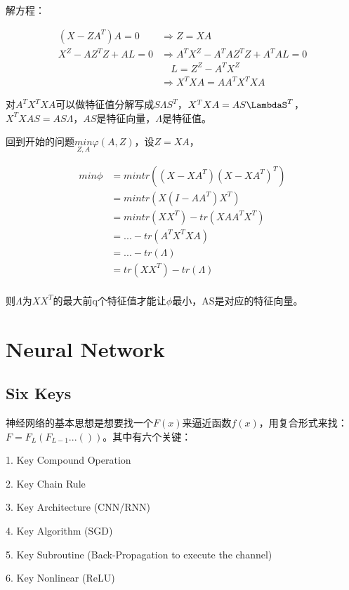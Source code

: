 \documentclass[12pt,UTF8,AutoFakeBold]{article}
\begin{document}
解方程：

\begin{equation}
\begin{aligned}
(X-ZA^T) A=0 & \Rightarrow Z=XA \\
X^Z-AZ^TZ+AL=0 & \Rightarrow A^TX^Z-A^TAZ^TZ+A^TAL=0\\
& \quad L=Z^Z-A^TX^Z\\
& \Rightarrow X^TXA=AA^TX^TXA
\end{aligned}
\end{equation}

对$A^TX^T X A$可以做特征值分解写成$S\Lambda S^T$，$X^T X A=AS\LambdaS^T$，$X^T X A S=A S\Lambda$，$AS$是特征向量，$\Lambda$是特征值。

回到开始的问题$\underset {Z,A}{min} \varphi (A,Z)$，设$Z=XA$，

\begin{equation}
\begin{aligned}
min \phi & = min tr((X-XA^T)(X-XA^T)^T)\\
& = min tr(X(I-AA^T)X^T)\\
& = min tr(XX^T)-tr(XAA^TX^T)\\
& = ...-tr(A^TX^TXA)\\
& = ...-tr(\Lambda)\\
& = tr(XX^T)-tr(\Lambda)\\
\end{aligned}
\end{equation}

则$\Lambda$为$XX^T$的最大前q个特征值才能让$\phi$最小，AS是对应的特征向量。


\section{Neural Network}
\subsection{Six Keys}
神经网络的基本思想是想要找一个$F(x)$来逼近函数$f(x)$，用复合形式来找：$F=F_L(F_{L-1}...())$。其中有六个关键：

1. Key Compound Operation 

2. Key Chain Rule 

3. Key Architecture (CNN/RNN)

4. Key Algorithm (SGD)

5. Key Subroutine (Back-Propagation to execute the channel)

6. Key Nonlinear (ReLU)
\end{document}
